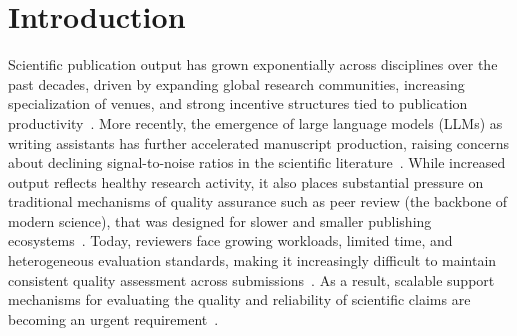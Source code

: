 \documentclass{article}
\begin{document}
\begin{abstract}
Agentic Reproducibility Assessment (ARA) formalizes reproducibility assessment as a structured reasoning task over scientific documents.
Given a paper, ARA extracts a directed workflow graph linking sources, methods, experiments, and outputs, then evaluates its reconstructability using structural and content-based scores for reproducibility assessments.
Experiments on 213 ReScience C articles -- the largest cross-domain benchmark of human-validated computational reproducibility studies considered to date --demonstrate ARA's generalizability and consistent workflow reconstruction and assessment across LLMs, model temperatures, and scientific domains.
These results highlight ARA's potential to complement human review at scale and support next-generation peer review.
\end{abstract}




\section{Introduction}

Scientific publication output has grown exponentially across disciplines over the past decades, driven by expanding global research communities, increasing specialization of venues, and strong incentive structures tied to publication productivity~\citep{parchomovsky2000publish,szalay2006science}. 
More recently, the emergence of large language models (LLMs) as writing assistants has further accelerated manuscript production, raising concerns about declining signal-to-noise ratios in the scientific literature~\citep{mosca2023distinguishing,cheng2024have}. 
While increased output reflects healthy research activity, it also places substantial pressure on traditional mechanisms of quality assurance such as peer review (the backbone of modern science), that was designed for slower and smaller publishing ecosystems~\citep{zhou2024llm}. 
Today, reviewers face growing workloads, limited time, and heterogeneous evaluation standards, making it increasingly difficult to maintain consistent quality assessment across submissions~\citep{ellison2011peer}. 
As a result, scalable support mechanisms for evaluating the quality and reliability of scientific claims are becoming an urgent requirement~\citep{wei2025ai}.
\end{document}
